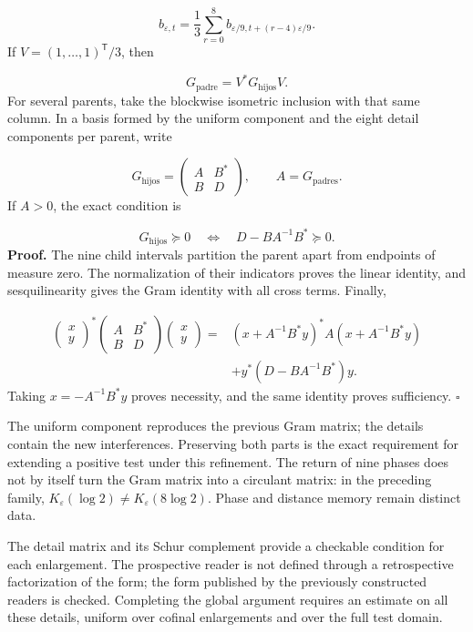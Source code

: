 \[
b_{\varepsilon,t}=\frac13\sum_{r=0}^8
b_{\varepsilon/9,t+(r-4)\varepsilon/9}.
\]
If \(V=(1,\ldots,1)^{\mathsf T}/3\), then

\[
G_{\mathrm{padre}}=V^*G_{\mathrm{hijos}}V.
\]
For several parents, take the blockwise isometric inclusion with that same column. In a basis formed by the uniform component and the eight detail components per parent, write

\[
G_{\mathrm{hijos}}=
\begin{pmatrix}A&B^*\\B&D\end{pmatrix},\qquad
A=G_{\mathrm{padres}}.
\]
If \(A>0\), the exact condition is

\[
G_{\mathrm{hijos}}\succeq0
\quad\Longleftrightarrow\quad D-BA^{-1}B^*\succeq0.
\]
\textbf{Proof.} The nine child intervals partition the parent apart from endpoints of measure zero. The normalization of their indicators proves the linear identity, and sesquilinearity gives the Gram identity with all cross terms. Finally,

\[
\begin{aligned}
\begin{pmatrix}x\\y\end{pmatrix}^*
\begin{pmatrix}A&B^*\\B&D\end{pmatrix}
\begin{pmatrix}x\\y\end{pmatrix}
={}&(x+A^{-1}B^*y)^*A(x+A^{-1}B^*y)\\
&+y^*(D-BA^{-1}B^*)y.
\end{aligned}
\]
Taking \(x=-A^{-1}B^*y\) proves necessity, and the same identity proves sufficiency. \hfill\(\square\)

The uniform component reproduces the previous Gram matrix; the details contain the new interferences. Preserving both parts is the exact requirement for extending a positive test under this refinement. The return of nine phases does not by itself turn the Gram matrix into a circulant matrix: in the preceding family, \(K_\varepsilon(\log2)\neq K_\varepsilon(8\log2)\). Phase and distance memory remain distinct data.

The detail matrix and its Schur complement provide a checkable condition for each enlargement. The prospective reader is not defined through a retrospective factorization of the form; the form published by the previously constructed readers is checked. Completing the global argument requires an estimate on all these details, uniform over cofinal enlargements and over the full test domain.

